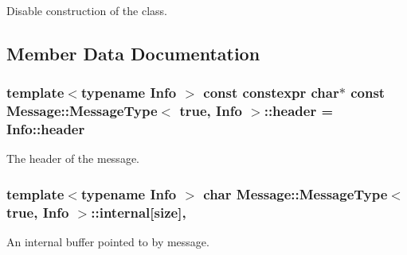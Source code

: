 Disable construction of the class. 



\subsection{Member Data Documentation}
\subsubsection[{\texorpdfstring{header}{header}}]{\setlength{\rightskip}{0pt plus 5cm}template$<$typename Info $>$ const constexpr char$\ast$ const {\bf Message\+::\+Message\+Type}$<$ true, Info $>$\+::header = Info\+::header\hspace{0.3cm}{\ttfamily [static]}}\hypertarget{struct_message_1_1_message_type_3_01true_00_01_info_01_4_a1518832727d6d5e69c44f12f88a70783}{}\label{struct_message_1_1_message_type_3_01true_00_01_info_01_4_a1518832727d6d5e69c44f12f88a70783}


The header of the message. 

\subsubsection[{\texorpdfstring{internal}{internal}}]{\setlength{\rightskip}{0pt plus 5cm}template$<$typename Info $>$ char {\bf Message\+::\+Message\+Type}$<$ true, Info $>$\+::internal\mbox{[}{\bf size}\mbox{]}\hspace{0.3cm}{\ttfamily [static]}, {\ttfamily [private]}}\hypertarget{struct_message_1_1_message_type_3_01true_00_01_info_01_4_aeea842ffe065f9b13581baa057f0e691}{}\label{struct_message_1_1_message_type_3_01true_00_01_info_01_4_aeea842ffe065f9b13581baa057f0e691}


An internal buffer pointed to by message. 

